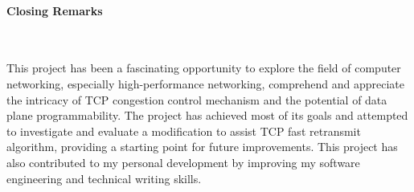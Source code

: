\paragraph{Closing Remarks}\ 

This project has been a fascinating opportunity to explore the field of computer networking, especially high-performance networking, comprehend and appreciate the intricacy of TCP congestion control mechanism and the potential of data plane programmability. The project has achieved most of its goals and attempted to investigate and evaluate a modification to assist TCP fast retransmit algorithm, providing a starting point for future improvements. This project has also contributed to my personal development by improving my software engineering and technical writing skills.